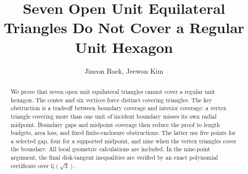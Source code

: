 \documentclass{amsart}
\title[Seven triangles do not cover the unit hexagon]
{Seven Open Unit Equilateral Triangles Do Not Cover a Regular Unit Hexagon}
\author{Jineon Baek, Jeewon Kim}
\theoremstyle{definition}
\theoremstyle{remark}
\begin{document}
\raggedbottom
\setcounter{secnumdepth}{3}

\begin{abstract}
We prove that seven open unit equilateral triangles cannot cover a regular
unit hexagon. The center and six vertices force distinct covering triangles.
The key obstruction is a tradeoff between boundary coverage and interior
coverage: a vertex triangle covering more than one unit of incident boundary
misses its own radial midpoint. Boundary gaps and midpoint coverage then
reduce the proof to length budgets, area loss, and fixed finite-enclosure
obstructions. The latter use five points for a selected gap, four for a
supported midpoint, and nine when the vertex triangles cover the boundary.
All local geometric calculations are included. In the nine-point argument,
the final disk-tangent inequalities are verified by an exact polynomial
certificate over $\mathbb Q(\sqrt3)$.
\end{abstract}

\maketitle
\setcounter{tocdepth}{1}
\tableofcontents









\label{page:proof-body-end}
\end{document}

